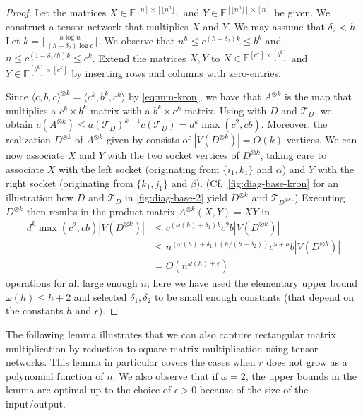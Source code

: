 \documentclass{toc}
\newcommand{\bra}{\ensuremath{\langle}}
\newcommand{\ket}{\ensuremath{\rangle}}
\newcommand{\F}{\ensuremath{\mathbb{F}}}
\newcommand{\td}{\ensuremath{\mathcal{T}_D}}
\newcommand{\tdk}{\ensuremath{\mathcal{T}_{D^{\otimes k}}}}
\begin{document}
\begin{proof}
Let the matrices $X\in\F^{[n]\times[\lfloor n^h\rfloor]}$
and $Y\in\F^{[\lfloor n^h\rfloor]\times[n]}$ be given. We construct
a tensor network that multiplies $X$ and $Y$.
We may assume that $\delta_2<h$.
Let $k=\lceil\frac{h\log n}{(h-\delta_2)\log c}\rceil$.
We observe that $n^h\leq c^{(h-\delta_2)k}\leq b^k$
and $n\leq c^{(1-\delta_2/h)k}\leq c^k$.
Extend the matrices $X,Y$ to $X\in\F^{[c^k]\times [b^k]}$ and
$Y\in\F^{[b^k]\times [c^k]}$ by inserting rows and columns with
zero-entries.

Since $\bra c,b,c\ket^{\otimes k}=\bra c^k,b^k,c^k\ket$ by
\eqref{eq:mm-kron}, we have that $A^{\otimes k}$ is the map that
multiplies a $c^k\times b^k$ matrix with a $b^k\times c^k$ matrix.
Using  with $D$ and $\td$, we obtain
$c(A^{\otimes k})\leq a(\td)^{k-1}c(\td)=d^{k}\max(c^2,cb)$.
Moreover, the realization $D^{\otimes k}$ of $A^{\otimes k}$
given by  consists of
$|V(D^{\otimes k})|=O(k)$ vertices.
We can now associate $X$ and $Y$ with the
two socket vertices of $D^{\otimes k}$, taking care to
associate $X$ with the left socket (originating from $\{i_1,k_1\}$ and $\alpha$)
and $Y$ with the right socket (originating from $\{k_1,j_1\}$ and $\beta$).
(Cf.~\eqref{fig:diag-base-kron} for an illustration how $D$ and $\td$
in \eqref{fig:diag-base-2} yield $D^{\otimes k}$ and $\tdk$.)
Executing $D^{\otimes k}$ then results in the product matrix
$A^{\otimes k}(X,Y)=XY$ in
\[
\begin{split}
d^{k}\max(c^2,cb)|V(D^{\otimes k})|
 &\leq c^{(\omega(h)+\delta_1)k}c^2b|V(D^{\otimes k})| \\
 &\leq n^{(\omega(h)+\delta_1)(h/(h-\delta_2))}c^{5+h}b|V(D^{\otimes k})| \\
 &=O(n^{\omega(h)+\epsilon})
\end{split}
\]
operations for all large enough $n$; here we have used the elementary
upper bound $\omega(h)\leq h+2$ and selected $\delta_1,\delta_2$ to be
small enough constants (that depend on the constants $h$ and $\epsilon$).
\end{proof}

The following lemma illustrates that we can also capture rectangular matrix
multiplication by reduction to square matrix multiplication using tensor
networks. This lemma in particular covers the cases when $r$ does not grow
as a polynomial function of $n$. We also observe that if $\omega=2$, the upper
bounds in the lemma are optimal up to the choice of $\epsilon>0$ because of
the size of the input/output.
\end{document}
